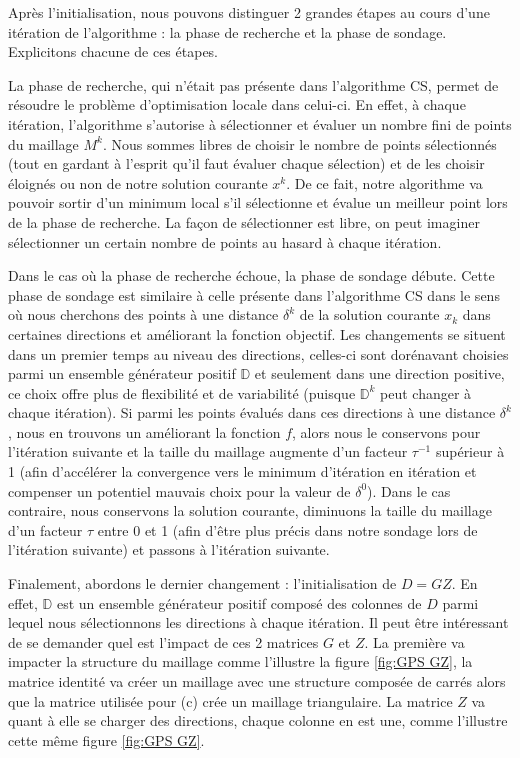 \documentclass[french]{report}
\newcommand{\D}{\mathbb{D}}
\begin{document}
Après l'initialisation, nous pouvons distinguer 2 grandes étapes au cours d'une itération de l'algorithme : la phase de recherche et la phase de sondage. Explicitons chacune de ces étapes.

La phase de recherche, qui n'était pas présente dans l'algorithme CS, permet de résoudre le problème d'optimisation locale dans celui-ci. En effet, à chaque itération, l'algorithme s'autorise à sélectionner et évaluer un nombre fini de points du maillage $M^k$. Nous sommes libres de choisir le nombre de points sélectionnés (tout en gardant à l'esprit qu'il faut évaluer chaque sélection) et de les choisir éloignés ou non de notre solution courante $x^k$. De ce fait, notre algorithme va pouvoir sortir d'un minimum local s'il sélectionne et évalue un meilleur point lors de la phase de recherche. La façon de sélectionner est libre, on peut imaginer sélectionner un certain nombre de points au hasard à chaque itération.

Dans le cas où la phase de recherche échoue, la phase de sondage débute. Cette phase de sondage est similaire à celle présente dans l'algorithme CS dans le sens où nous cherchons des points à une distance $\delta^k$ de la solution courante $x_k$ dans certaines directions et améliorant la fonction objectif. Les changements se situent dans un premier temps au niveau des directions, celles-ci sont dorénavant choisies parmi un ensemble générateur positif $\D$ et seulement dans une direction positive, ce choix offre plus de flexibilité et de variabilité (puisque $\D^k$ peut changer à chaque itération). Si parmi les points évalués dans ces directions à une distance $\delta^k$, nous en trouvons un améliorant la fonction $f$, alors nous le conservons pour l'itération suivante et la taille du maillage augmente d'un facteur $\tau^{-1}$ supérieur à 1 (afin d'accélérer la convergence vers le minimum d'itération en itération et compenser un potentiel mauvais choix pour la valeur de $\delta^0$). Dans le cas contraire, nous conservons la solution courante, diminuons la taille du maillage d'un facteur $\tau$ entre 0 et 1 (afin d'être plus précis dans notre sondage lors de l'itération suivante) et passons à l'itération suivante.

Finalement, abordons le dernier changement : l'initialisation de $D = G Z$. En effet, $\D$ est un ensemble générateur positif composé des colonnes de $D$ parmi lequel nous sélectionnons les directions à chaque itération. Il peut être intéressant de se demander quel est l'impact de ces 2 matrices $G$ et $Z$. La première va impacter la structure du maillage comme l'illustre la figure \ref{fig:GPS GZ}, la matrice identité va créer un maillage avec une structure composée de carrés alors que la matrice utilisée pour (c) crée un maillage triangulaire. La matrice $Z$ va quant à elle se charger des directions, chaque colonne en est une, comme l'illustre cette même figure \ref{fig:GPS GZ}.
\end{document}
